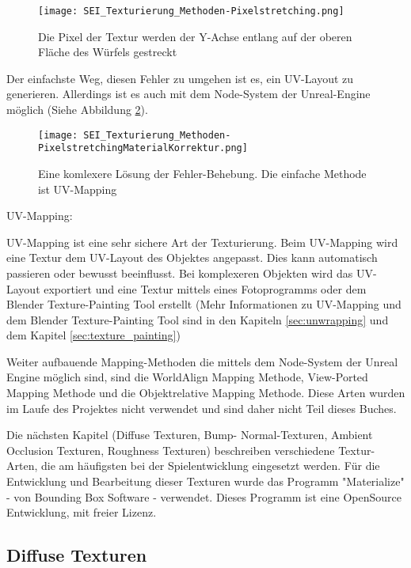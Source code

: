 \begin{figure}[H]
    \centering
    \texttt{[image: SEI\_Texturierung\_Methoden-Pixelstretching.png]}
    \caption{Die Pixel der Textur werden der Y-Achse entlang auf der oberen Fläche des Würfels gestreckt}
    \label{picture:tex_streching}
\end{figure}

Der einfachste Weg, diesen Fehler zu umgehen ist es, ein UV-Layout zu generieren. Allerdings ist es auch mit dem
Node-System der Unreal-Engine\citep{ue:node_introduction} möglich (Siehe Abbildung \ref{picture:tex_streching_solve}).


\begin{figure}[H]
    \centering
    \texttt{[image: SEI\_Texturierung\_Methoden-PixelstretchingMaterialKorrektur.png]}
    \caption{Eine komlexere Lösung der Fehler-Behebung. Die einfache Methode ist UV-Mapping}
    \label{picture:tex_streching_solve}
\end{figure}


UV-Mapping:

UV-Mapping ist eine sehr sichere Art der Texturierung. Beim UV-Mapping wird eine Textur dem UV-Layout des Objektes
angepasst. Dies kann automatisch passieren oder bewusst beeinflusst. Bei komplexeren Objekten wird das UV-Layout
exportiert und eine Textur mittels eines Fotoprogramms oder dem Blender Texture-Painting Tool erstellt
(Mehr Informationen zu UV-Mapping und dem Blender Texture-Painting Tool sind in den Kapiteln \ref{sec:unwrapping} und
dem Kapitel \ref{sec:texture_painting})


Weiter aufbauende Mapping-Methoden die mittels dem Node-System der Unreal Engine möglich sind, sind die WorldAlign
Mapping Methode, View-Ported Mapping Methode und die Objektrelative Mapping Methode. Diese Arten wurden im Laufe
des Projektes nicht verwendet und sind daher nicht Teil dieses Buches.

Die nächsten Kapitel (Diffuse Texturen, Bump- Normal-Texturen, Ambient Occlusion Texturen, Roughness Texturen)
beschreiben verschiedene Textur-Arten, die am häufigsten bei der Spielentwicklung eingesetzt werden. Für die
Entwicklung und Bearbeitung dieser Texturen wurde das Programm "Materialize" - von Bounding Box
Software\citep{bbs:materialize} - verwendet. Dieses Programm ist eine OpenSource Entwicklung, mit freier Lizenz.


\subsection{Diffuse Texturen}
\label{sec:tex_diffuse}

